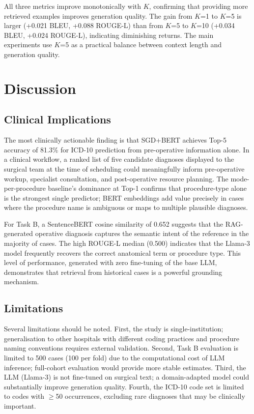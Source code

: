 \documentclass[10pt,twocolumn]{article}
\begin{document}
All three metrics improve monotonically with $K$, confirming that providing more retrieved examples improves generation quality. The gain from $K$=1 to $K$=5 is larger (+0.021 BLEU, +0.088 ROUGE-L) than from $K$=5 to $K$=10 (+0.034 BLEU, +0.024 ROUGE-L), indicating diminishing returns. The main experiments use $K$=5 as a practical balance between context length and generation quality.

\section{Discussion}
\label{sec:discussion}

\subsection{Clinical Implications}
The most clinically actionable finding is that SGD+BERT achieves Top-5 accuracy of 81.3\% for ICD-10 prediction from pre-operative information alone. In a clinical workflow, a ranked list of five candidate diagnoses displayed to the surgical team at the time of scheduling could meaningfully inform pre-operative workup, specialist consultation, and post-operative resource planning. The mode-per-procedure baseline's dominance at Top-1 confirms that procedure-type alone is the strongest single predictor; BERT embeddings add value precisely in cases where the procedure name is ambiguous or maps to multiple plausible diagnoses.

For Task B, a SentenceBERT cosine similarity of 0.652 suggests that the RAG-generated operative diagnosis captures the semantic intent of the reference in the majority of cases. The high ROUGE-L median (0.500) indicates that the Llama-3 model frequently recovers the correct anatomical term or procedure type. This level of performance, generated with zero fine-tuning of the base LLM, demonstrates that retrieval from historical cases is a powerful grounding mechanism.

\subsection{Limitations}
Several limitations should be noted. First, the study is single-institution; generalisation to other hospitals with different coding practices and procedure naming conventions requires external validation. Second, Task B evaluation is limited to 500 cases (100 per fold) due to the computational cost of LLM inference; full-cohort evaluation would provide more stable estimates. Third, the LLM (Llama-3) is not fine-tuned on surgical text; a domain-adapted model could substantially improve generation quality. Fourth, the ICD-10 code set is limited to codes with $\geq$50 occurrences, excluding rare diagnoses that may be clinically important.
\end{document}
